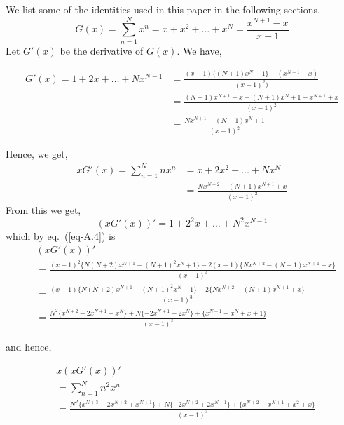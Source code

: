 \begin{multicols}{2}
We list some of the identities used in this paper in the following sections.
\begin{equation*}
G(x) = \displaystyle{\sum_{n=1}^{N}}x^n = x+x^2+\ldots+x^N = \displaystyle{\frac{x^{N+1}-x}{x-1}}\tag{A.1}\label{eq-A.1}
\end{equation*}
Let $G'(x)$ be the derivative of $G(x)$. We have,

{\fontsize{7}{8}\selectfont\begin{align*}
G'(x) = 1+2x+\ldots+Nx^{N-1} &= \displaystyle{\frac{(x-1)\{(N+1)x^{N}-1\}- (x^{N+1}-x)}{(x-1)^2)}}\\
     &= \displaystyle{\frac{(N+1)x^{N+1}-x-(N+1)x^{N}+1-x^{N+1}+x}{(x-1)^2}}\\
     &= \displaystyle{\frac{Nx^{N+1}-(N+1)x^N + 1}{(x-1)^2}}
\end{align*}}

Hence, we get,
\begin{align*}
xG'(x) = \displaystyle{\sum_{n=1}^{N}}nx^n &= x+2x^2+\ldots+ Nx^N \nonumber\\
&=\displaystyle{\frac{Nx^{N+2}-(N+1)x^{N+1}+x}{(x-1)^2}}\tag{A.2}\label{eq-A.2}
\end{align*}
From this we get,
\begin{equation*}
(xG'(x))' = 1+2^2x+\ldots+N^2x^{N-1}\tag{A.3}\label{eq-A.3}
\end{equation*}
which by eq.~(\ref{eq-A.4}) is 
{\fontsize{6}{7}\selectfont
\begin{align*}
&\nonumber(xG'(x))' \\
&= \displaystyle{\frac{(x-1)^2\{N(N+2)x^{N+1}-(N+1)^2x^N+1\}-2(x-1)\{Nx^{N+2}-(N+1)x^{N+1}+x\}}{(x-1)^4}}\\
\nonumber&= \displaystyle{\frac{(x-1)\{N(N+2)x^{N+1}-(N+1)^2x^N+1\}-2\{Nx^{N+2}-(N+1)x^{N+1}+x\}}{(x-1)^3}}\\
\nonumber&= \displaystyle{\frac{N^2\{x^{N+2}-2x^{N+1}+x^N\}+ N\{-2x^{N+1}+2x^N\}+\{x^{N+1}+x^N+x+1\}}{(x-1)^3}}
\end{align*}}

\vspace{-.6cm}

and hence,

\vspace{-.6cm}

{\fontsize{6}{7}\selectfont\begin{align*}
&\nonumber x(xG'(x))'\\
 &= \displaystyle{\sum_{n=1}^{N}}n^2x^n \\
&= \displaystyle{\frac{N^2\{x^{N+3}-2x^{N+2}+x^{N+1}\}+ N\{-2x^{N+2}+2x^{N+1}\}+\{x^{N+2}+x^{N+1}+x^2+x\}}{(x-1)^3}}\tag{A.4}\label{eq-A.4}
\end{align*}}


\end{multicols}

